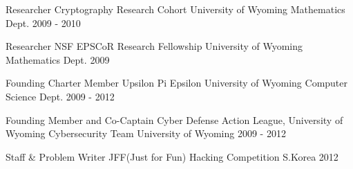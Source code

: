 


\begin{cvhonors}


\cvhonor
{Researcher} %
{Cryptography Research Cohort} %
{University of Wyoming Mathematics Dept.} %
{2009 - 2010} %
    

\cvhonor
{Researcher} %
{NSF EPSCoR Research Fellowship} %
{University of Wyoming Mathematics Dept.} %
{2009} %


\cvhonor
{Founding Charter Member} %
{Upsilon Pi Epsilon} %
{University of Wyoming Computer Science Dept.} %
{2009 - 2012} %


\cvhonor
{Founding Member and Co-Captain} %
{Cyber Defense Action League, University of Wyoming Cybersecurity Team} %
{University of Wyoming} %
{2009 - 2012} %


\cvhonor
{Staff \& Problem Writer} %
{JFF(Just for Fun) Hacking Competition} %
{S.Korea} %
{2012} %


\end{cvhonors}